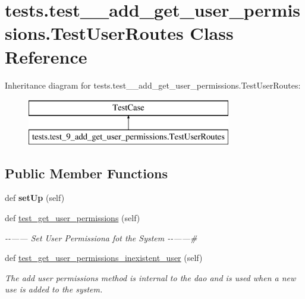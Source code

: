 \hypertarget{classtests_1_1test__9__add__get__user__permissions_1_1_test_user_routes}{}\section{tests.\+test\+\_\+\_\+add\+\_\+get\+\_\+user\+\_\+permissions.\+Test\+User\+Routes Class Reference}
\label{classtests_1_1test__9__add__get__user__permissions_1_1_test_user_routes}
Inheritance diagram for tests.\+test\+\_\+\_\+add\+\_\+get\+\_\+user\+\_\+permissions.\+Test\+User\+Routes\+:\begin{figure}[H]
\begin{center}
\leavevmode
\includegraphics[height=2.000000cm]{classtests_1_1test__9__add__get__user__permissions_1_1_test_user_routes}
\end{center}
\end{figure}
\subsection*{Public Member Functions}
\begin{DoxyCompactItemize}
\item 
\mbox{\label{classtests_1_1test__9__add__get__user__permissions_1_1_test_user_routes_ab24762752f548094967f4bff0443bcaa}} 
def {\bfseries set\+Up} (self)
\item 
def \hyperlink{classtests_1_1test__9__add__get__user__permissions_1_1_test_user_routes_a51c2e523936ee6d64740ede8a5a3f84f}{test\+\_\+get\+\_\+user\+\_\+permissions} (self)
\begin{DoxyCompactList}\small\item\em -\/-\/------ Set User Permissiona fot the System -\/-\/------\# \end{DoxyCompactList}\item 
def \hyperlink{classtests_1_1test__9__add__get__user__permissions_1_1_test_user_routes_a5f2561c9f8eff8a8fcc6363a633f1ef2}{test\+\_\+get\+\_\+user\+\_\+permissions\+\_\+inexistent\+\_\+user} (self)
\begin{DoxyCompactList}\small\item\em The add user permissions method is internal to the dao and is used when a new use is added to the system. \end{DoxyCompactList}\end{DoxyCompactItemize}
